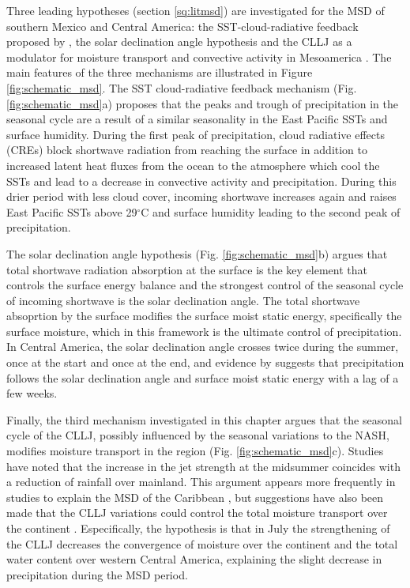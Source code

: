 Three leading hypotheses (section \ref{sq:litmsd}) are investigated for the MSD of southern Mexico and Central America:
the SST-cloud-radiative feedback proposed by \cite{magana1999}, the solar declination angle hypothesis \citep{karnauskas2013} and the CLLJ as a modulator for moisture transport and convective activity in Mesoamerica \citep{herrera2015,zermeno2019}.
The main features of the three mechanisms are illustrated in Figure \ref{fig:schematic_msd}. 
The  SST cloud-radiative feedback mechanism (Fig. \ref{fig:schematic_msd}a) proposes that the peaks and trough of precipitation in the seasonal cycle are a result of a similar seasonality in the East Pacific SSTs and surface humidity. 
During the first peak of precipitation, cloud radiative effects (CREs) block shortwave radiation from reaching the surface in addition to increased latent heat fluxes from the ocean to the atmosphere which cool the SSTs and lead to a decrease in convective activity and precipitation.
During this drier period with less cloud cover, incoming shortwave increases again and raises East Pacific SSTs above 29$^\circ$C and surface humidity leading to the second peak of precipitation. %

The solar declination angle hypothesis (Fig. \ref{fig:schematic_msd}b) argues that total shortwave radiation absorption at the surface is the key element that controls the surface energy balance and the strongest control of the seasonal cycle of incoming shortwave is the solar declination angle. The total shortwave absoprtion by the surface modifies the surface moist static energy, specifically the surface moisture, which in this framework is the ultimate control of precipitation. In Central America, the solar declination angle crosses twice during the summer, once at the start and once at the end, and evidence by \cite{karnauskas2013} suggests that precipitation follows the solar declination angle and surface moist static energy with a lag of a few weeks.

Finally, the third mechanism investigated in this chapter argues that the seasonal cycle of the CLLJ, possibly influenced by the seasonal variations to the NASH, modifies moisture transport in the region (Fig. \ref{fig:schematic_msd}c). Studies have noted that the increase in the jet strength at the midsummer coincides with a reduction of rainfall over mainland. This argument appears more frequently in studies to explain the MSD of the Caribbean \citep[e.g.][]{martinez2019}, but suggestions have also been made that the CLLJ variations could control the total moisture transport over the continent \citep{herrera2015}. Especifically, the hypothesis is that in July  the strengthening of the CLLJ decreases the convergence of moisture over the continent and the total water content over western Central America, explaining the slight decrease in precipitation during the MSD period.

